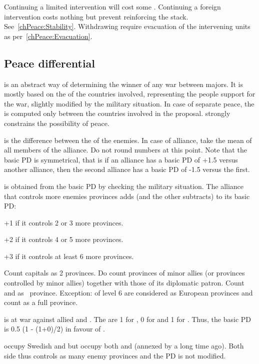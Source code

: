 \aparag Continuing a limited intervention will cost some \STAB. Continuing a
foreign intervention costs nothing but prevent reinforcing the
stack. See~\ref{chPeace:Stability}.
\bparag Withdrawing require evacuation of the intervening units as
per~\ref{chPeace:Evacuation}.

\subsection{Peace differential}
 is an abstract way of determining the
winner of any war between majors. It is mostly based on the \STAB of the
countries involved, representing the people support for the war, slightly
modified by the military situation.
\bparag In case of separate peace, the  is computed
only between the countries involved in the proposal.
\bparag {} strongly constrains the possibility of
peace.

 is the difference between the \STAB of
the enemies.
\bparag In case of alliance, take the mean \STAB of all members of the
alliance. Do not round numbers at this point.
\bparag Note that the basic PD is symmetrical, that is if an alliance has a
basic PD of +1.5 versus another alliance, then the second alliance has a basic
PD of -1.5 versus the first.

 is obtained from the basic PD by
checking the military situation.
\bparag The alliance that controls more enemies provinces adds (and the other
subtracts) to its basic PD:
\begin{modlist}
  \item[+1] if it controls 2 or 3 more provinces.
  \item[+2] if it controls 4 or 5 more provinces.
  \item[+3] if it controls at least 6 more provinces.
\end{modlist}
\bparag Count capitals as 2 provinces.
\bparag Do count provinces of minor allies (or provinces controlled by minor
allies) together with those of its diplomatic patron.
\bparag Count \COL and \TP as \undemi\ province. Exception: \COL of level
6 are considered as European provinces and count as a full province.

\begin{exemple}
  \RUS is at war against allied \TUR and \SUE. The \STAB are 1 for \RUS, 0 for
  \SUE and 1 for \TUR. Thus, the basic PD is 0.5 (1 - (1+0)/2) in favour of
  \RUS.

  \RUS occupy Swedish \provinceNeva and \provinceKarelen but \TUR occupy both
  \provinceAstragan and \provinceTerek (annexed by \RUS a long time
  ago). Both side thus controls as many enemy provinces and the PD is not
  modified.
\end{exemple}


